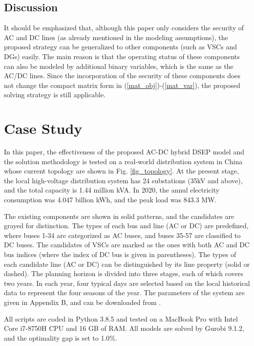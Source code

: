 \documentclass[a4paper,fleqn]{cas-dc}
\begin{document}
{\color{blue}
\subsection{Discussion}

It should be emphasized that, although this paper only considers the 
security of AC and DC lines (as already mentioned in the modeling assumptions), 
the proposed strategy can be generalized to other components (such as VSCs and 
DGs) easily. The main reason is that the operating status of these components 
can also be modeled by additional binary variables, which is the same as the 
AC/DC lines. Since the incorporation of the security of these components does 
not change the compact matrix form in (\ref{mat_obj})-(\ref{mat_var}), the 
proposed solving strategy is still applicable.
}

\section{Case Study}\label{}

In this paper, the effectiveness of the proposed AC-DC hybrid DSEP model and 
the solution methodology is tested on a real-world distribution system in 
China whose current topology are shown in Fig. \ref{fig_topology}. At the 
present stage, the local high-voltage distribution system has 24 substations 
(35kV and above), and the total capacity is 1.44 million kVA. In 2020, the 
annul electricity consumption was 4.047 billion kWh, and the peak load was 
843.3 MW. 
{\color{blue}
The existing components are shown in solid patterns, and the candidates are 
grayed for distinction. The types of each bus and line (AC or DC) are 
predefined, where buses 1-34 are categorized as AC buses, and buses 35-57 are 
classified to DC buses. The candidates of VSCs are marked as the ones with both 
AC and DC bus indices (where the index of DC bus is given in parentheses). The 
types of each candidate line (AC or DC) can be distinguished by its line 
property (solid or dashed). The planning horizon is divided into three stages, 
each of which covers two years. In each year, four typical days are selected 
based on the local historical data to represent the four seasons of the year.
The parameters of the system are given in Appendix B, and can be downloaded 
from \cite{Liu_Homepage}. 

All scripts are coded in Python 3.8.5 and tested on a MacBook Pro with 
Intel Core i7-8750H CPU and 16 GB of RAM. All models are solved by Gurobi
9.1.2, and the optimality gap is set to 1.0\%.
}
\end{document}
